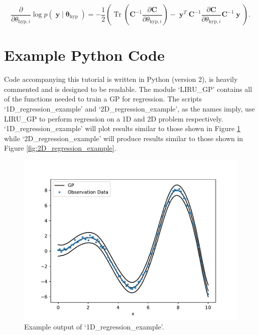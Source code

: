 \documentclass[a4paper, 11pt]{article}
\DeclareMathOperator{\Tr}{Tr}
\DeclareMathOperator{\y}{\boldsymbol{y}}
\DeclareMathOperator{\pa}{\boldsymbol{\theta}}
\begin{document}
\begin{equation}
	\frac{\partial}{\partial \theta_{\text{hyp},i}} \log p(\y|\pa_{\text{hyp}}) = -\frac{1}{2} \left( \Tr\left( \boldsymbol{C}^{-1} \frac{\partial \boldsymbol{C}}{\partial \theta_{\text{hyp},i}} \right) - \y^T \boldsymbol{C}^{-1} \frac{\partial \boldsymbol{C}}{\partial \theta_{\text{hyp},i}} \boldsymbol{C}^{-1} \y \right).
\end{equation}	

\section{Example Python Code}
Code accompanying this tutorial is written in Python (version 2), is heavily commented and is designed to be readable. The module `LIRU\_GP' contains all of the functions needed to train a GP for regression. The scripts `1D\_regression\_example' and `2D\_regression\_example', as the names imply, use LIRU\_GP to perform regression on a 1D and 2D problem respectively. `1D\_regression\_example' will plot results similar to those shown in Figure \ref{fig:1D_regression_example} while `2D\_regression\_example' will produce results similar to those shown in Figure \ref{fig:2D_regression_example}.\\

\begin{figure}[H]
	\centering
	\includegraphics[scale=0.6,trim={0 0cm 0 0cm},clip]{figures/1D_regression.pdf}
	\caption{Example output of `1D\_regression\_example'.}
	\label{fig:1D_regression_example}
\end{figure}
\end{document}
